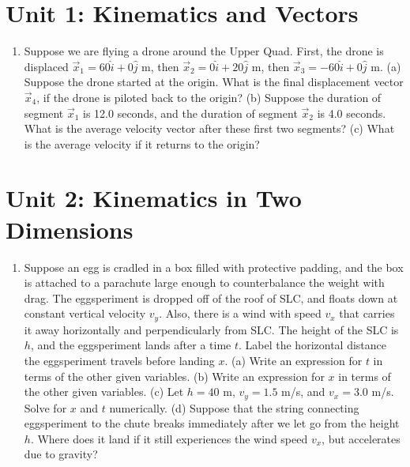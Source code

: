 \documentclass[10pt]{article}
\begin{document}
\section{Unit 1: Kinematics and Vectors}
\begin{enumerate}
\item Suppose we are flying a drone around the Upper Quad.  First, the drone is displaced $\vec{x}_1 = 60\hat{i} + 0\hat{j}$ m, then $\vec{x}_2 = 0\hat{i} + 20\hat{j}$ m, then $\vec{x}_3 = -60\hat{i} + 0\hat{j}$ m.  (a) Suppose the drone started at the origin.  What is the final displacement vector $\vec{x}_4$, if the drone is piloted back to the origin? (b) Suppose the duration of segment $\vec{x}_1$ is 12.0 seconds, and the duration of segment $\vec{x}_2$ is 4.0 seconds.  What is the average velocity vector after these first two segments? (c) What is the average velocity if it returns to the origin? \\ \vspace{2cm}
\end{enumerate}

\section{Unit 2: Kinematics in Two Dimensions}
\begin{enumerate}
\item Suppose an egg is cradled in a box filled with protective padding, and the box is attached to a parachute large enough to counterbalance the weight with drag.  The eggsperiment is dropped off of the roof of SLC, and floats down at constant vertical velocity $v_y$.  Also, there is a wind with speed $v_x$ that carries it away horizontally and perpendicularly from SLC.  The height of the SLC is $h$, and the eggsperiment lands after a time $t$.  Label the horizontal distance the eggsperiment travels before landing $x$.  (a) Write an expression for $t$ in terms of the other given variables.  (b) Write an expression for $x$ in terms of the other given variables.  (c) Let $h = 40$ m, $v_y = 1.5$ m/s, and $v_x = 3.0$ m/s.  Solve for $x$ and $t$ numerically.  (d) Suppose that the string connecting eggsperiment to the chute breaks immediately after we let go from the height $h$.  Where does it land if it still experiences the wind speed $v_x$, but accelerates due to gravity? \\ \vspace{3cm}
\end{enumerate}
\end{document}
